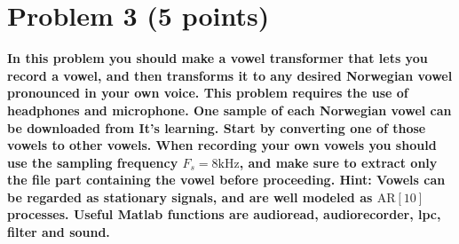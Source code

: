 \section{Problem 3 (5 points)}
\textbf{In this problem you should make a vowel transformer that lets you record a vowel, and then transforms it to any desired Norwegian vowel pronounced in your own voice. This problem requires the use of headphones and microphone.
One sample of each Norwegian vowel can be downloaded from It's learning. Start by converting one of those vowels to other vowels.
When recording your own vowels you should use the sampling frequency $F_s=8 \mathrm{kHz}$, and make sure to extract only the file part containing the vowel before proceeding.
Hint: Vowels can be regarded as stationary signals, and are well modeled as $\mathrm{AR}[10]$ processes.
Useful Matlab functions are audioread, audiorecorder, lpc, filter and sound.}